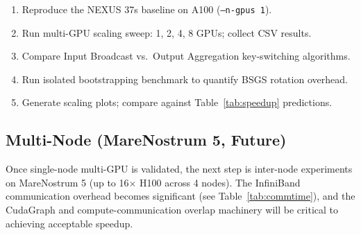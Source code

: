 \documentclass[11pt,letterpaper]{article}
\begin{document}
\begin{enumerate}
  \item Reproduce the NEXUS 37s baseline on A100 (\texttt{--n-gpus 1}).
  \item Run multi-GPU scaling sweep: 1, 2, 4, 8 GPUs; collect CSV results.
  \item Compare Input Broadcast vs.\ Output Aggregation key-switching algorithms.
  \item Run isolated bootstrapping benchmark to quantify BSGS rotation overhead.
  \item Generate scaling plots; compare against Table~\ref{tab:speedup} predictions.
\end{enumerate}

\subsection{Multi-Node (MareNostrum 5, Future)}

Once single-node multi-GPU is validated, the next step is inter-node experiments on
MareNostrum 5 (up to 16$\times$ H100 across 4 nodes). The InfiniBand communication
overhead becomes significant (see Table~\ref{tab:commtime}), and the CudaGraph and
compute-communication overlap machinery will be critical to achieving acceptable speedup.
\end{document}
